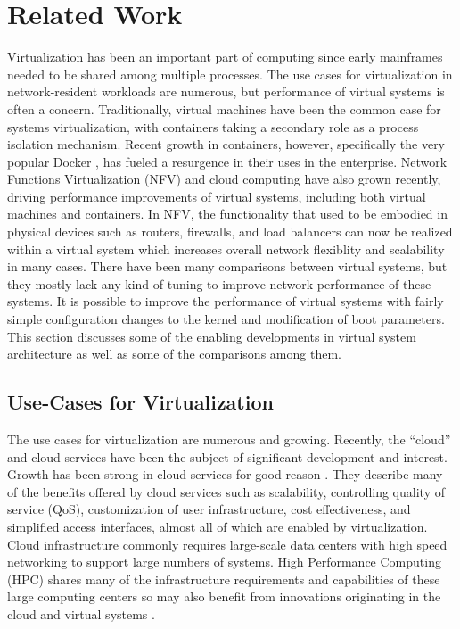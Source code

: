 \chapter{Related Work}
\label{sec:related_work}
Virtualization has been an important part of computing since early mainframes needed to be shared among multiple processes.
The use cases for virtualization in network-resident workloads are numerous, but performance of virtual systems is often a concern.
Traditionally, virtual machines have been the common case for systems virtualization, with containers taking a secondary role as a process isolation mechanism.
Recent growth in containers, however, specifically the very popular Docker \autocite{dockerdotcom}, has fueled a resurgence in their uses in the enterprise.
Network Functions Virtualization (NFV) and cloud computing have also grown recently, driving performance improvements of virtual systems, including both virtual machines and containers.
In NFV, the functionality that used to be embodied in physical devices such as routers, firewalls, and load balancers can now be realized within a virtual system which increases overall network flexiblity and scalability in many cases.
There have been many comparisons between virtual systems, but they mostly lack any kind of tuning to improve network performance of these systems.
It is possible to improve the performance of virtual systems with fairly simple configuration changes to the kernel and modification of boot parameters.
This section discusses some of the enabling developments in virtual system architecture as well as some of the comparisons among them.  

\section{Use-Cases for Virtualization} %
\label{sec:usecasesvt}
The use cases for virtualization are numerous and growing. 
Recently, the ``cloud'' and cloud services have been the subject of significant development and interest.
Growth has been strong in cloud services for good reason \autocite{_younge_1}.
They describe many of the benefits offered by cloud services such as scalability, controlling quality of service (QoS), customization of user infrastructure, cost effectiveness, and simplified access interfaces, almost all of which are enabled by virtualization.  
Cloud infrastructure commonly requires large-scale data centers with high speed networking to support large numbers of systems.  
High Performance Computing (HPC) shares many of the infrastructure requirements and capabilities of these large computing centers so may also benefit from innovations originating in the cloud and virtual systems \autocite{xavier2013performance, _younge_1}.

